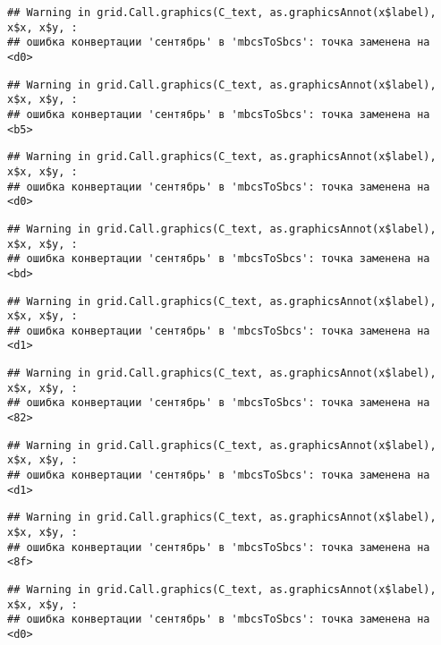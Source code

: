 \documentclass[
]{article}
\begin{document}
\begin{verbatim}
## Warning in grid.Call.graphics(C_text, as.graphicsAnnot(x$label), x$x, x$y, :
## ошибка конвертации 'сентябрь' в 'mbcsToSbcs': точка заменена на <d0>
\end{verbatim}

\begin{verbatim}
## Warning in grid.Call.graphics(C_text, as.graphicsAnnot(x$label), x$x, x$y, :
## ошибка конвертации 'сентябрь' в 'mbcsToSbcs': точка заменена на <b5>
\end{verbatim}

\begin{verbatim}
## Warning in grid.Call.graphics(C_text, as.graphicsAnnot(x$label), x$x, x$y, :
## ошибка конвертации 'сентябрь' в 'mbcsToSbcs': точка заменена на <d0>
\end{verbatim}

\begin{verbatim}
## Warning in grid.Call.graphics(C_text, as.graphicsAnnot(x$label), x$x, x$y, :
## ошибка конвертации 'сентябрь' в 'mbcsToSbcs': точка заменена на <bd>
\end{verbatim}

\begin{verbatim}
## Warning in grid.Call.graphics(C_text, as.graphicsAnnot(x$label), x$x, x$y, :
## ошибка конвертации 'сентябрь' в 'mbcsToSbcs': точка заменена на <d1>
\end{verbatim}

\begin{verbatim}
## Warning in grid.Call.graphics(C_text, as.graphicsAnnot(x$label), x$x, x$y, :
## ошибка конвертации 'сентябрь' в 'mbcsToSbcs': точка заменена на <82>
\end{verbatim}

\begin{verbatim}
## Warning in grid.Call.graphics(C_text, as.graphicsAnnot(x$label), x$x, x$y, :
## ошибка конвертации 'сентябрь' в 'mbcsToSbcs': точка заменена на <d1>
\end{verbatim}

\begin{verbatim}
## Warning in grid.Call.graphics(C_text, as.graphicsAnnot(x$label), x$x, x$y, :
## ошибка конвертации 'сентябрь' в 'mbcsToSbcs': точка заменена на <8f>
\end{verbatim}

\begin{verbatim}
## Warning in grid.Call.graphics(C_text, as.graphicsAnnot(x$label), x$x, x$y, :
## ошибка конвертации 'сентябрь' в 'mbcsToSbcs': точка заменена на <d0>
\end{verbatim}
\end{document}
